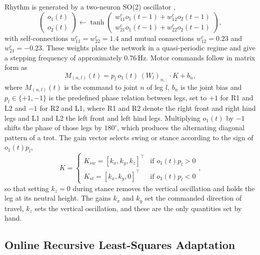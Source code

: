 \documentclass[a4paper, 10pt, conference]{ieeeconf}
\begin{document}
Rhythm is generated by a two-neuron SO(2) oscillator
\cite{pasemann2003,miguelblanco2020},
\begin{equation}
  \begin{pmatrix} o_1(t) \\ o_2(t) \end{pmatrix}
  \leftarrow \tanh
  \begin{pmatrix} w^c_{11}o_1(t-1) + w^c_{12}o_2(t-1) \\
                  w^c_{21}o_1(t-1) + w^c_{22}o_2(t-1) \end{pmatrix},
  \label{eq:cpg}
\end{equation}
with self-connections $w^c_{11}=w^c_{22}=1.4$ and mutual connections
$w^c_{12}=0.23$ and $w^c_{21}=-0.23$. These weights place the network in a
quasi-periodic regime \cite{pasemann2003} and give a stepping frequency of
approximately $0.76$\,Hz. Motor commands follow in matrix form as
\begin{equation}
  M_{(n,l)}(t) = p_l\,o_1(t)\,(W_l)_{n,:}\cdot K + b_n ,
  \label{eq:motor}
\end{equation}
where $M_{(n,l)}(t)$ is the command to joint $n$ of leg $l$, $b_n$ is the joint
bias and $p_l\in\{+1,-1\}$ is the predefined phase relation between legs, set to
$+1$ for R1 and L2 and $-1$ for R2 and L1, where R1 and R2 denote the right
front and right hind legs and L1 and L2 the left front and left hind legs.
Multiplying $o_1(t)$ by $-1$ shifts
the phase of those legs by $180^\circ$, which produces the alternating diagonal
pattern of a trot. The gain vector selects swing or stance according to the sign
of $o_1(t)p_l$,
\begin{equation}
  K = \begin{cases}
    K_{sw} = [k_x, k_y, k_z]^\top
      & \text{if } o_1(t) p_l > 0 \\
    K_{st} = [k_x, k_y, 0]^\top
      & \text{if } o_1(t) p_l < 0
  \end{cases},
  \label{eq:gain}
\end{equation}
so that setting $k_z=0$ during stance removes the vertical oscillation and holds
the leg at its neutral height. The gains $k_x$ and $k_y$ set the commanded
direction of travel, $k_z$ sets the vertical oscillation, and these are the only
quantities set by hand.

\subsection{Online Recursive Least-Squares Adaptation}
\label{sec:online}
\end{document}

